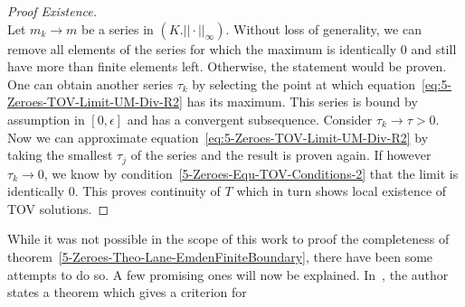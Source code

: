 \begin{proof}[Proof  Existence]
\begin{equation}
		\label{eq:5-Zeroes-TOV-Last-Term}
	\end{equation}
	Let $m_k\rightarrow m$ be a series in $(K.||\cdot||_\infty)$.
	Without loss of generality, we can remove all elements of the series for which the maximum is identically $0$ and still have more than finite elements left.
	Otherwise, the statement would be proven.
	One can obtain another series $\tau_k$ by selecting the point at which equation~\eqref{eq:5-Zeroes-TOV-Limit-UM-Div-R2} has its maximum.
	This series is bound by assumption in $[0,\epsilon]$ and has a convergent subsequence.
	Consider $\tau_k\rightarrow\tau>0$.
	Now we can approximate equation~\eqref{eq:5-Zeroes-TOV-Limit-UM-Div-R2} by taking the smallest $\tau_j$ of the series and the result is proven again.
	If however $\tau_k\rightarrow0$, we know by condition~\eqref{5-Zeroes-Equ-TOV-Conditions-2} that the limit is identically $0$.
	This proves continuity of $T$ which in turn shows local existence of \ac{TOV} solutions.
\end{proof}\noindent
While it was not possible in the scope of this work to proof the completeness of theorem~\ref{5-Zeroes-Theo-Lane-EmdenFiniteBoundary}, there have been some attempts to do so.
A few promising ones will now be explained.
In~\cite{walterOrdinaryDifferentialEquations1998}, the author states a theorem which gives a criterion for